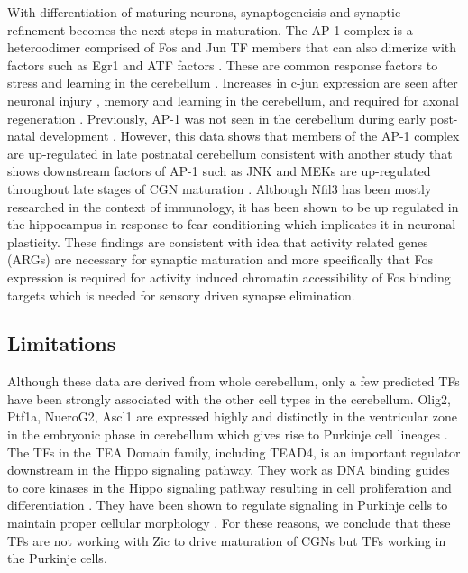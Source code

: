 \documentclass[fleqn,10pt]{wlscirep}
\begin{document}
With differentiation of maturing neurons, synaptogeneisis and synaptic refinement becomes the next steps in maturation. The AP-1 complex is a heteroodimer comprised of Fos and Jun TF members that can also dimerize with factors such as Egr1 and ATF factors \cite{Raivich2006RoleBrain}. These are common response factors to stress and learning in the cerebellum \cite{Nakamura2015ExpressionActivity, Coffey2000DualNeurons}. Increases in c-jun expression are seen after neuronal injury \cite{Liu2000TranstentorialMice}, memory and learning in the cerebellum, and required for axonal regeneration \cite{Raivich2004TheRegeneration, Raivich2006RoleBrain}. Previously, AP-1 was not seen in the cerebellum during early post-natal development \cite{Guerrini1997Glutamate-DependentDevelopment}. However, this data shows that members of the AP-1 complex are up-regulated in late postnatal cerebellum consistent with another study that shows downstream factors of AP-1 such as JNK and MEKs are up-regulated throughout late stages of CGN maturation \cite{Coffey2000DualNeurons}. Although Nfil3 has been mostly researched in the context of immunology, it has been shown to be up regulated in the hippocampus in response to fear conditioning \cite{Mizuno2020Long-lastingConditioning} which implicates it in neuronal plasticity. These findings are consistent with idea that activity related genes (ARGs) are necessary for synaptic maturation\cite{West2011NeuronalFunction} and more specifically that Fos expression is required for activity induced chromatin accessibility of Fos binding targets\cite{Su2017NeuronalBrain} which is needed for sensory driven synapse elimination. 


\subsection*{Limitations}
Although these data are derived from whole cerebellum, only a few predicted TFs have been strongly associated with the other cell types in the cerebellum. Olig2, Ptf1a, NueroG2, Ascl1 are expressed highly and distinctly in the ventricular zone in the embryonic phase in cerebellum which gives rise to Purkinje cell lineages \cite{Lowenstein2021Olig3Development}. The TFs in the TEA Domain family, including TEAD4, is an important regulator downstream in the Hippo signaling pathway. They work as DNA binding guides to core kinases in the Hippo signaling pathway resulting in cell proliferation and differentiation  \cite{Lavado2018TheNumber, Jin2020TheDiseases}. They have been shown to regulate signaling in Purkinje cells to maintain proper cellular morphology \cite{Jin2020TheDiseases}. For these reasons, we conclude that these TFs are not working with Zic to drive maturation of CGNs but TFs working in the Purkinje cells.
\end{document}
